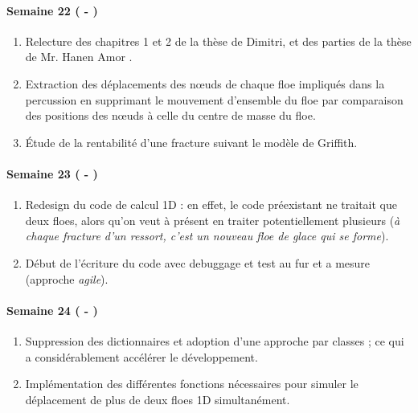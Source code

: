 \paragraph{Semaine 22 ( - )} 
\begin{enumerate}
    \item Relecture des chapitres 1 et 2 de la thèse de Dimitri, et des parties de la thèse de Mr. Hanen Amor \parencite{amor2008approche}. 
    \item Extraction des déplacements des n\oe{}uds de chaque floe impliqués dans la percussion en supprimant le mouvement d'ensemble du floe par comparaison des positions des n\oe{}uds à celle du centre de masse du floe.
    \item Étude de la rentabilité d'une fracture suivant le modèle de Griffith.
\end{enumerate}
  
  
\paragraph{Semaine 23 ( - )} 
\begin{enumerate}
    \item Redesign du code de calcul 1D : en effet, le code préexistant ne traitait que deux floes, alors qu'on veut à présent en traiter potentiellement plusieurs (\emph{à chaque fracture d'un ressort, c'est un nouveau floe de glace qui se forme}).
    \item Début de l'écriture du code avec debuggage et test au fur et a mesure (approche \emph{agile}).
\end{enumerate}


\paragraph{Semaine 24 ( - )} 
\begin{enumerate}
    \item Suppression des dictionnaires et adoption d'une approche par classes ; ce qui a considérablement accélérer le développement.
    \item Implémentation des différentes fonctions nécessaires pour simuler le déplacement de plus de deux floes 1D simultanément.
\end{enumerate}
  
